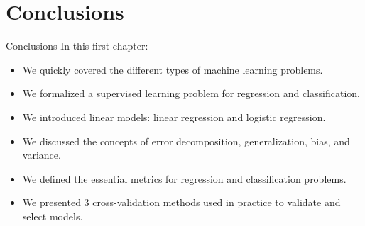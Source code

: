 \section[Conclusions]{Conclusions}

\begin{frame}{Conclusions}
	In this first chapter:
	\begin{itemize}
		\item We quickly covered the different types of machine learning problems.
		\item We formalized a supervised learning problem for regression and classification.
		\item We introduced linear models: linear regression and logistic regression.
		\item We discussed the concepts of error decomposition, generalization, bias, and variance.
		\item We defined the essential metrics for regression and classification problems.
		\item We presented 3 cross-validation methods used in practice to validate and select models.
	\end{itemize}
\end{frame}